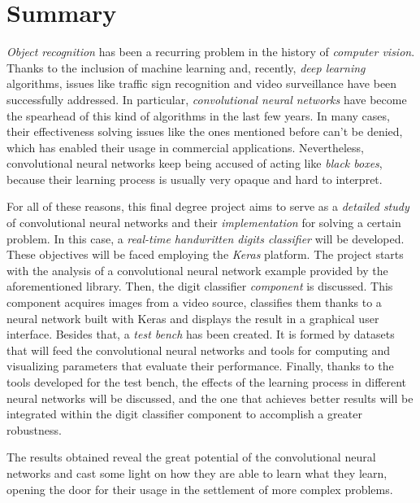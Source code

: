 \chapter*{Summary}
\emph{Object recognition} has been a recurring problem in the history of \emph{computer vision}. Thanks to the inclusion of machine learning and, recently, \emph{deep learning} algorithms, issues like traffic sign recognition and video surveillance have been successfully addressed. In particular, \emph{convolutional neural networks} have become the spearhead of this kind of algorithms in the last few years. In many cases, their effectiveness solving issues like the ones mentioned before can't be denied, which has enabled their usage in commercial applications. Nevertheless, convolutional neural networks keep being accused of acting like \emph{black boxes}, because their learning process is usually very opaque and hard to interpret.

For all of these reasons, this final degree project aims to serve as a \emph{detailed study} of convolutional neural networks and their \emph{implementation} for solving a certain problem. In this case, a \emph{real-time handwritten digits classifier} will be developed. These objectives will be faced employing the \emph{Keras} platform. The project starts with the analysis of a convolutional neural network example provided by the aforementioned library. Then, the digit classifier \emph{component} is discussed. This component acquires images from a video source, classifies them thanks to a neural network built with Keras and displays the result in a graphical user interface.  Besides that, a \emph{test bench} has been created. It is formed by datasets that will feed the convolutional neural networks and tools for computing and visualizing parameters that evaluate their performance. Finally, thanks to the tools developed for the test bench, the effects of the learning process in different neural networks will be discussed, and the one that achieves better results will be integrated within the digit classifier component to accomplish a greater robustness.

The results obtained reveal the great potential of the convolutional neural networks and cast some light on how they are able to learn what they learn, opening the door for their usage in the settlement of more complex problems.